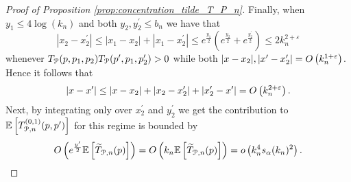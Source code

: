 \begin{proof}[Proof of Proposition \ref{prop:concentration_tilde_T_P_n}]
Finally, when $y_1 \le 4\log(k_n)$ and both $y_2, y_2^\prime \le b_n$ we have that
\[
	|x_2 - x_2^\prime| \le |x_1 - x_2| + |x_1 - x_2^\prime| \le e^{\frac{y_1}{2}}\left(e^{\frac{y_2}{2}} + e^{\frac{y_2^\prime}{2}}\right) \le 2k_n^{2+\varepsilon}
\]
whenever $T_{{\mathcal P}}(p,p_1,p_2) T_{{\mathcal P}}(p^\prime,p_1,p_2^\prime) > 0$ while both $|x - x_2|, |x^\prime - x_2^\prime| = O\left(k_n^{1 + \varepsilon}\right)$. Hence it follows that
\[
	|x - x^\prime| \le |x - x_2| + |x_2 - x_2^\prime| + |x_2^\prime - x^\prime| = O\left(k_n^{2 + \varepsilon}\right).
\]
Next, by integrating only over $x_2^\prime$ and $y_2^\prime $ we get the contribution to $\mathbb{E}\left[T^{(0,1)}_{{\mathcal P},n}(p,p^\prime)\right]$ for this regime is bounded by
\[
	O\left(e^{\frac{y^\prime}{2}} \mathbb{E}\left[\widetilde{T}_{{\mathcal P},n}(p)\right]\right)
	= O\left(k_n \mathbb{E}\left[\widetilde{T}_{{\mathcal P},n}(p)\right]\right) = o\left(k_n^4 s_\alpha(k_n)^2\right).
\]



%

\end{proof}

%
%

